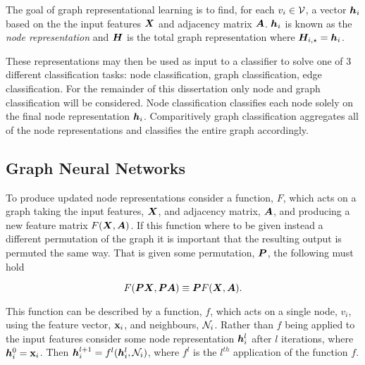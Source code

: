 
The goal of graph representational learning is to find, for each $v_i \in {\mathcal{V}}$, a vector ${\bm{h}}_i$ based on the the input features ${\bm{X}}$ and adjacency matrix ${\bm{A}}$.
${\bm{h}}_i$ is known as the \emph{node representation} and ${\bm{H}}$ is the total graph representation where ${\bm{H}}_{i, \star} = {\bm{h}}_i$.



These representations may then be used as input to a classifier to solve one of 3 different classification tasks: node classification, graph classification, edge classification.
For the remainder of this dissertation only node and graph classification will be considered.
Node classification classifies each node solely on the final node representation ${\bm{h}}_i$.
Comparitively graph classification aggregates all of the node representations and classifies the entire graph accordingly.

\subsection{Graph Neural Networks}


To produce updated node representations consider a function, $F$, which acts on a graph taking the input features, ${\bm{X}}$, and adjacency matrix, ${\bm{A}}$, and producing a new feature matrix $F({\bm{X}}, {\bm{A}})$.
If this function where to be given instead a different permutation of the graph it is important that the resulting output is permuted the same way.
That is given some permutation, ${\bm{P}}$, the following must hold

\begin{equation}
    F({\bm{P}}{\bm{X}}, {\bm{P}}{\bm{A}}) \equiv {\bm{P}} F({\bm{X}}, {\bm{A}}).
\end{equation}

This function can be described by a function, $f$, which acts on a single node, $v_i$, using the feature vector, ${\textbf{x}}_i$, and neighbours, ${\mathcal{N}}_i$.
Rather than $f$ being applied to the input features consider some node representation ${\bm{h}}_i^l$ after $l$ iterations, where ${\bm{h}}_i^0 = {\textbf{x}}_i$.
Then ${\bm{h}}_i^{l+1} = f^l({\bm{h}}_i^l, {\mathcal{N}}_i)$, where $f^l$ is the $l^{th}$ application of the function $f$.

